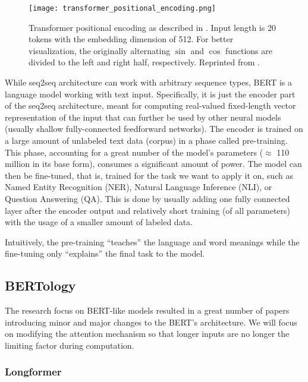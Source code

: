 \begin{figure}[!htb]
        \centering
        \texttt{[image: transformer\_positional\_encoding.png]}
        \caption{Transformer positional encoding as described in \citep{attention-is-all-you-need}. Input length is 20 tokens with the embedding dimension of 512. For better visualization, the originally alternating $\sin$ and $\cos$ functions are divided to the left and right half, respectively. Reprinted from \citep{illustrated-transformer}.}
        \label{fig:pos_emb}
\end{figure}

While seq2seq architecture can work with arbitrary sequence types, BERT is a language model working with text input. 
Specifically, it is just the encoder part of the seq2seq architecture, meant for computing real-valued fixed-length vector representation of the input that can further be used by other neural models (usually shallow fully-connected feedforward networks).
The encoder is trained on a large amount of unlabeled text data (corpus) in a phase called pre-training.
This phase, accounting for a great number of the model's parameters ($\approx$ 110 million in its base form), consumes a significant amount of power. 
The model can then be fine-tuned, that is, trained for the task we want to apply it on, such as Named Entity Recognition (NER), Natural Language Inference (NLI), or Question Answering (QA). 
This is done by usually adding one fully connected layer after the encoder output and relatively short training (of all parameters) with the usage of a smaller amount of labeled data. 

Intuitively, the pre-training ``teaches'' the language and word meanings while the fine-tuning only ``explains'' the final task to the model.

\subsection{BERTology}

The research focus on BERT-like models resulted in a great number of papers introducing minor and major changes to the BERT's architecture.
We will focus on modifying the attention mechanism so that longer inputs are no longer the limiting factor during computation. 

\subsubsection{Longformer}

